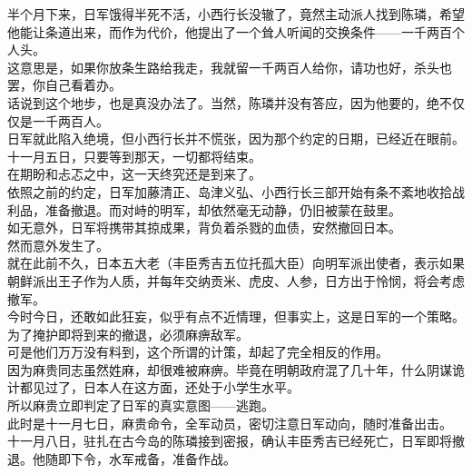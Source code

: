 \begin{multicols}{\theparacolNo}
半个月下来，日军饿得半死不活，小西行长没辙了，竟然主动派人找到陈璘，希望他能让条道出来，而作为代价，他提出了一个耸人听闻的交换条件——一千两百个人头。\\

这意思是，如果你放条生路给我走，我就留一千两百人给你，请功也好，杀头也罢，你自己看着办。\\

话说到这个地步，也是真没办法了。当然，陈璘并没有答应，因为他要的，绝不仅仅是一千两百人。\\

日军就此陷入绝境，但小西行长并不慌张，因为那个约定的日期，已经近在眼前。\\

十一月五日，只要等到那天，一切都将结束。\\

在期盼和忐忑之中，这一天终究还是到来了。\\

依照之前的约定，日军加藤清正、岛津义弘、小西行长三部开始有条不紊地收拾战利品，准备撤退。而对峙的明军，却依然毫无动静，仍旧被蒙在鼓里。\\

如无意外，日军将携带其掠成果，背负着杀戮的血债，安然撤回日本。\\

然而意外发生了。\\

就在此前不久，日本五大老（丰臣秀吉五位托孤大臣）向明军派出使者，表示如果朝鲜派出王子作为人质，并每年交纳贡米、虎皮、人参，日方出于怜悯，将会考虑撤军。\\

今时今日，还敢如此狂妄，似乎有点不近情理，但事实上，这是日军的一个策略。为了掩护即将到来的撤退，必须麻痹敌军。\\

可是他们万万没有料到，这个所谓的计策，却起了完全相反的作用。\\

因为麻贵同志虽然姓麻，却很难被麻痹。毕竟在明朝政府混了几十年，什么阴谋诡计都见过了，日本人在这方面，还处于小学生水平。\\

所以麻贵立即判定了日军的真实意图——逃跑。\\

此时是十一月七日，麻贵命令，全军动员，密切注意日军动向，随时准备出击。\\

十一月八日，驻扎在古今岛的陈璘接到密报，确认丰臣秀吉已经死亡，日军即将撤退。他随即下令，水军戒备，准备作战。\\


\end{multicols}
